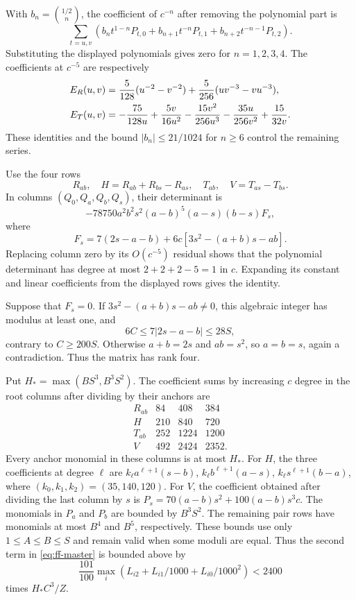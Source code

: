 \documentclass[12pt]{article}
\numberwithin{equation}{section}
\begin{document}
With $b_n=\binom{1/2}{n}$, the coefficient of $c^{-n}$ after removing
the polynomial part is
\begin{equation*}
 \sum_{t=u,v}\left(b_nt^{1-n}P_{t,0}
       +b_{n+1}t^{-n}P_{t,1}+b_{n+2}t^{-n-1}P_{t,2}\right).
\end{equation*}
Substituting the displayed polynomials gives zero for $n=1,2,3,4$.
The coefficients at $c^{-5}$ are respectively
\begin{align}
 E_R(u,v)&=\frac5{128}(u^{-2}-v^{-2})
              +\frac5{256}(uv^{-3}-vu^{-3}),\label{eq:ff-leading}\\
 E_T(u,v)&=-\frac{75}{128u}+\frac{5v}{16u^2}
 -\frac{15v^2}{256u^3}-\frac{35u}{256v^2}+\frac{15}{32v}.\notag
\end{align}
These identities and the bound $|b_n|\le21/1024$ for $n\ge6$ control the remaining series.

Use the four rows
\begin{equation}\label{eq:ff-prows}
 R_{ab},\quad H=R_{ab}+R_{bs}-R_{as},\quad
 T_{ab},\quad V=T_{as}-T_{bs}.
\end{equation}
In columns $(Q_0,Q_a,Q_b,Q_s)$, their determinant is
\begin{equation*}
 -78750a^2b^2s^2(a-b)^5(a-s)(b-s)F_s,
\end{equation*}
where
\[
 F_s=7(2s-a-b)+6c[3s^2-(a+b)s-ab].
\]
Replacing column zero by its $O(c^{-5})$ residual shows that the
polynomial determinant has degree at most $2+2+2-5=1$ in $c$.
Expanding its constant and linear coefficients from the displayed rows
gives the identity.

Suppose that $F_s=0$. If $3s^2-(a+b)s-ab\ne0$, this algebraic integer
has modulus at least one, and
\[
 6C\le7|2s-a-b|\le28S,
\]
contrary to $C\ge200S$. Otherwise $a+b=2s$ and $ab=s^2$, so
$a=b=s$, again a contradiction. Thus the matrix has rank four.

Put $H_* =\max(BS^3,B^3S^2)$. The coefficient sums by increasing
$c$ degree in the root columns after dividing by their anchors are
\begin{equation*}
 \begin{array}{c|rrr}
  R_{ab}&84&408&384\\
  H&210&840&720\\
  T_{ab}&252&1224&1200\\
  V&492&2424&2352.
 \end{array}
\end{equation*}
Every anchor monomial in these columns is at most $H_*$.
For $H$, the three coefficients at degree $\ell$ are
$k_\ell a^{\ell+1}(s-b)$,
$k_\ell b^{\ell+1}(a-s)$,
$k_\ell s^{\ell+1}(b-a)$, where $(k_0,k_1,k_2)=(35,140,120)$.
For $V$, the coefficient obtained after dividing the last column by $s$ is
$P_s=70(a-b)s^2+100(a-b)s^3c$. The monomials in $P_a$ and $P_b$
are bounded by $B^3S^2$.
The remaining pair rows have monomials at most $B^4$ and $B^5$,
respectively. These bounds use only $1\le A\le B\le S$ and remain valid when some moduli are equal.
Thus the second term in \eqref{eq:ff-master} is bounded above by
\[
 \frac{101}{100}\max_i(L_{i2}+L_{i1}/1000+L_{i0}/1000^2)<2400
\]
times $H_*C^3/Z$.
\end{document}
